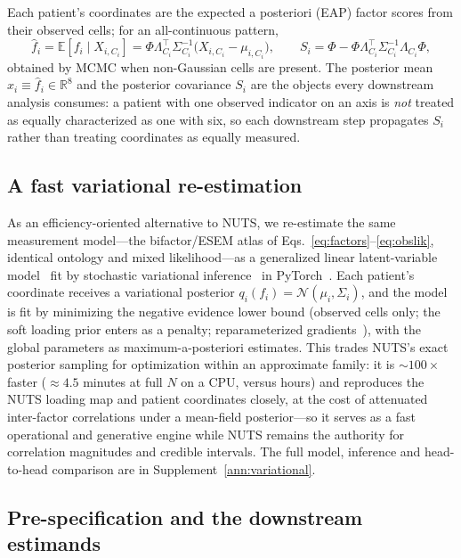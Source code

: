 Each patient's coordinates are the expected a posteriori (EAP) factor scores from their
observed cells; for an all-continuous pattern,
\begin{equation}
  \hat f_i=\mathbb E[f_i\mid X_{i,C_i}]
  =\Phi\Lambda_{C_i}^{\top}\Sigma_{C_i}^{-1}\!\big(X_{i,C_i}-\mu_{i,C_i}\big),\qquad
  S_i=\Phi-\Phi\Lambda_{C_i}^{\top}\Sigma_{C_i}^{-1}\Lambda_{C_i}\Phi ,
  \label{eq:m-scores}
\end{equation}
obtained by MCMC when non-Gaussian cells are present. The posterior mean
$x_i\equiv\hat f_i\in\mathbb R^{8}$ and the posterior covariance $S_i$ are the objects every
downstream analysis consumes: a patient with one observed indicator on an axis is \emph{not}
treated as equally characterized as one with six, so each downstream step propagates $S_i$
rather than treating coordinates as equally measured.

\subsection{A fast variational re-estimation}

As an efficiency-oriented alternative to NUTS, we re-estimate the same measurement
model---the bifactor/ESEM atlas of Eqs.~\eqref{eq:factors}--\eqref{eq:obslik}, identical
ontology and mixed likelihood---as a generalized linear latent-variable
model~\citep{hui2017gllvm} fit by stochastic variational
inference~\citep{blei2017vi,hoffman2013svi} in PyTorch~\citep{paszke2019pytorch}. Each
patient's coordinate receives a variational posterior $q_i(f_i)=\mathcal N(\mu_i,\Sigma_i)$,
and the model is fit by minimizing the negative evidence lower bound (observed cells only; the
soft loading prior enters as a penalty; reparameterized gradients~\citep{kingma2014vae}), with
the global parameters as maximum-a-posteriori estimates. This trades NUTS's exact posterior
sampling for optimization within an approximate family: it is ${\sim}100\times$ faster
(${\approx}4.5$ minutes at full $N$ on a CPU, versus hours) and reproduces the NUTS loading map
and patient coordinates closely, at the cost of attenuated inter-factor correlations under a
mean-field posterior---so it serves as a fast operational and generative engine while NUTS
remains the authority for correlation magnitudes and credible intervals. The full model,
inference and head-to-head comparison are in Supplement~\ref{ann:variational}.

\subsection{Pre-specification and the downstream estimands}

